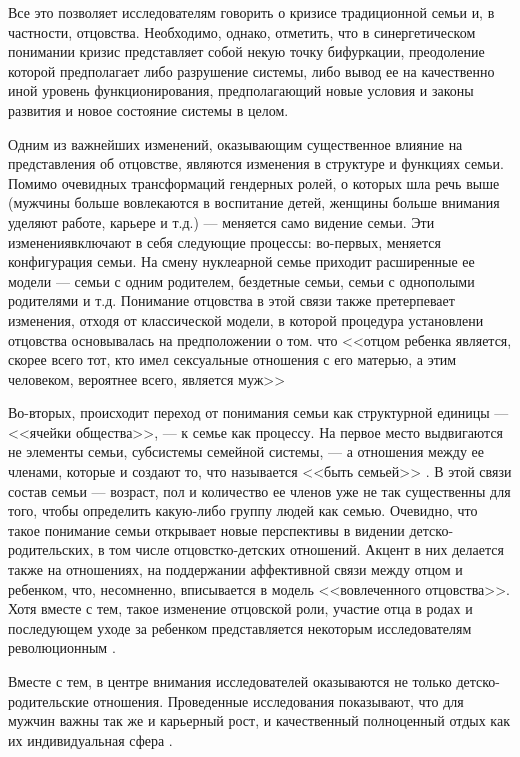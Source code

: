 \documentclass{../../common/thesisbyxetex}
\begin{document}
Все это позволяет исследователям говорить о кризисе традиционной семьи и, в частности, отцовства.
Необходимо, однако, отметить, что в синергетическом понимании кризис представляет собой некую точку
бифуркации, преодоление которой предполагает либо разрушение системы, либо вывод ее на качественно
иной уровень функционирования, предполагающий новые условия и законы развития и новое состояние
системы в целом.

Одним из важнейших изменений, оказывающим существенное влияние на представления об отцовстве,
являются
изменения в структуре и функциях семьи. Помимо очевидных трансформаций  гендерных ролей, о которых
шла
речь выше (мужчины больше вовлекаются в воспитание детей, женщины больше внимания уделяют
работе,
карьере и т.д.) --- меняется само видение семьи. Эти изменениявключают в себя следующие процессы:
во-первых, меняется конфигурация семьи. На смену нуклеарной семье приходит расширенные
ее модели --- семьи с одним родителем, бездетные семьи, семьи с однополыми родителями и т.д.
Понимание отцовства
в этой связи также претерпевает изменения, отходя от классической модели, в которой процедура
установлени отцовства основывалась на предположении о том. что <<отцом ребенка является, скорее
всего
 тот, кто имел сексуальные отношения с его матерью, а этим человеком, вероятнее всего,
является муж>> \cite[318]{legfat}

Во-вторых, происходит переход от понимания семьи как структурной единицы --- <<ячейки общества>>,
--- к семье как процессу. На первое место выдвигаются не элементы семьи, субсистемы семейной
системы, --- а отношения между ее членами, которые и создают то, что называется <<быть семьей>>
\cite{fam}. В этой связи состав семьи --- возраст, пол и количество ее членов уже не так
существенны для того, чтобы определить какую-либо группу людей как семью. Очевидно, что такое
понимание семьи открывает новые перспективы в видении детско-родительских, в том числе
отцовстко-детских отношений. Акцент в них делается также на отношениях, на поддержании аффективной
связи между отцом и ребенком, что, несомненно,  вписывается в модель <<вовлеченного отцовства>>.
Хотя вместе с тем, такое изменение отцовской роли, участие отца в родах и последующем уходе за
ребенком представляется некоторым исследователям
революционным \cite[15]{fatpsy}.

Вместе с тем, в центре внимания исследователей оказываются не только детско-родительские отношения.
Проведенные исследования показывают, что для мужчин важны так же и карьерный рост, и качественный
полноценный отдых как их индивидуальная сфера \cite{mercoh}.
\end{document}

